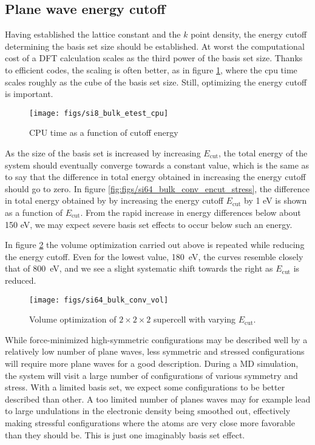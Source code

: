 \documentclass[11pt,bibliography=totoc,index=totoc]{scrbook}   %
\begin{document}
\subsection{Plane wave energy cutoff}

Having established the lattice constant and the $k$ point density, the energy cutoff determining the basis set size
should be established.
At worst the computational cost of a DFT calculation scales as the third power of the basis set size. 
Thanks to efficient codes, the scaling is often better, as in figure \ref{fig:si_bulk_conv_e_cpu}, where the 
cpu time scales roughly as the cube of the basis set size. Still, optimizing the energy cutoff is important.

\begin{figure}[htbp]
  \begin{center}
    \texttt{[image: figs/si8\_bulk\_etest\_cpu]}
  \end{center}
  \caption{CPU time as a function of cutoff energy}
  \label{fig:si_bulk_conv_e_cpu}
\end{figure}

As the size of the basis set is increased by increasing $E_{\text{cut}}$,
the total energy of the system should eventually converge towards a constant value, 
which is the same as to say that the difference in total energy obtained in increasing the energy cutoff should go to zero.
In figure \ref{fig:figs/si64_bulk_conv_encut_stress}, the difference 
in total energy obtained by by increasing the energy cutoff $E_{\text{cut}}$ by 1 eV is shown as a function of $E_{\text{cut}}$.
From the rapid increase in energy differences below about 150 eV, we may expect severe basis set effects to occur below such an energy.

In figure \ref{fig:figs/si64_bulk_conv_vol} the volume optimization carried out above is repeated while reducing the 
energy cutoff. Even for the lowest value, \SI{180}{\electronvolt}, the curves resemble closely that of \SI{800}{\electronvolt},
and we see a slight systematic shift towards the right as $E_{\text{cut}}$ is reduced.
\begin{figure}[htbp]
  \begin{center}
    \texttt{[image: figs/si64\_bulk\_conv\_vol]}
  \end{center}
  \caption{
  Volume optimization of $2\times2\times2$ supercell with varying $E_{\text{cut}}$.
  }
  \label{fig:figs/si64_bulk_conv_vol}
\end{figure}

While force-minimized high-symmetric configurations may be described well by a relatively low number of plane waves, 
less symmetric and stressed configurations will require more plane waves for a good description. 
During a MD simulation, the system will visit a large number of configurations of various symmetry and stress. 
With a limited basis set, we expect some configurations to be better described than other. 
A too limited number of planes waves may for example lead to large undulations in the electronic density being smoothed out, 
effectively making stressful configurations where the atoms are very close more favorable than they should be. 
This is just one imaginably basis set effect.
\end{document}

